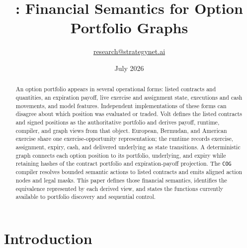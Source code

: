 \documentclass{strategynet-journal}
\title{\VOLT{}: Financial Semantics for Option Portfolio Graphs}
\author{\href{mailto:research@strategynet.ai}{research@strategynet.ai}}
\date{July 2026}
\newcommand{\VOLT}{\textsf{Volt}}
\newcommand{\COG}{\texttt{COG}}
\begin{document}
\maketitle

\begin{abstract}
An option portfolio appears in several operational forms: listed contracts and quantities, an expiration payoff, live exercise and assignment state, executions and cash movements, and model features.  Independent implementations of these forms can disagree about which position was evaluated or traded.  \VOLT{} defines the listed contracts and signed positions as the authoritative portfolio and derives payoff, runtime, compiler, and graph views from that object.  European, Bermudan, and American exercise share one exercise-opportunity representation; the runtime records exercise, assignment, expiry, cash, and delivered underlying as state transitions.  A deterministic graph connects each option position to its portfolio, underlying, and expiry while retaining hashes of the contract portfolio and expiration-payoff projection.  The \COG{} compiler resolves bounded semantic actions to listed contracts and emits aligned action nodes and legal masks.  This paper defines those financial semantics, identifies the equivalence represented by each derived view, and states the functions currently available to portfolio discovery and sequential control.
\end{abstract}

\SNtwocolumntableofcontents

\section{Introduction}
\end{document}
